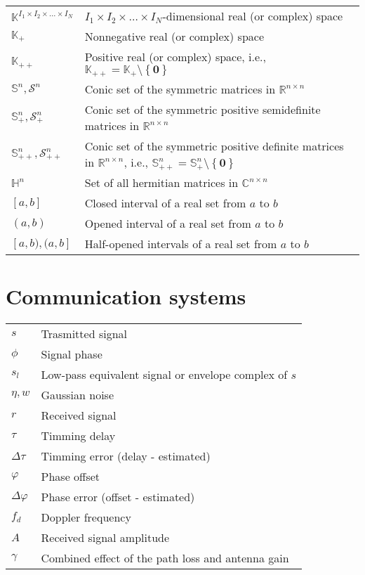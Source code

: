 \documentclass{article}
\begin{document}
\begin{xltabular}{\textwidth}{XX}
    \(\mathbb{K}^{I_1\times I_2 \times \dots \times I_N}\) & \(I_1\times I_2 \times \dots \times I_N\)-dimensional real (or complex) space\\
    \(\mathbb{K}_{+}\) & Nonnegative real (or complex) space\\
    \(\mathbb{K}_{++}\) & Positive real (or complex) space, i.e., \(\mathbb{K}_{++} = \mathbb{K}_{+}\setminus\left\{ \mathbf{0} \right\}\)\\
    \(\mathbb{S}^{n}, \mathcal{S}^{n}\) & Conic set of the symmetric matrices in \(\mathbb{R}^{n\times n}\)\\
    \(\mathbb{S}_{+}^{n}, \mathcal{S}_{+}^{n}\) & Conic set of the symmetric positive semidefinite matrices in \(\mathbb{R}^{n\times n}\)\\
    \(\mathbb{S}_{++}^{n}, \mathcal{S}_{++}^{n}\) & Conic set of the symmetric positive definite matrices in \(\mathbb{R}^{n\times n}\), i.e., \(\mathbb{S}_{++}^{n} = \mathbb{S}_{+}^{n}\setminus \left\{ \mathbf{0} \right\}\)\\
    \(\mathbb{H}^{n}\) & Set of all hermitian matrices in \(\mathbb{C}^{n\times n}\)\\
    \([a, b]\) & Closed interval of a real set from \(a\) to \(b\)\\
    \((a, b)\) & Opened interval of a real set from \(a\) to \(b\)\\
    \([a, b), (a, b]\) & Half-opened intervals of a real set from \(a\) to \(b\)\\
\end{xltabular}

\section{Communication systems}
\begin{xltabular}{\textwidth}{XX}
    \(s\) & Trasmitted signal\\
    \(\phi\) & Signal phase\\
    \(s_l\) & Low-pass equivalent signal or envelope complex of \(s\)\\
    \(\eta, w\) & Gaussian noise\\
    \(r\) & Received signal\\
    \(\tau\) & Timming delay \\
    \(\Delta\tau\) & Timming error (delay - estimated) \\
    \(\varphi\) & Phase offset \\
    \(\Delta\varphi\) & Phase error (offset - estimated) \\
    \(f_d\) & Doppler frequency\\
    \(A\) & Received signal amplitude\\
    \(\gamma\) & Combined effect of the path loss and antenna gain
\end{xltabular}
\end{document}
